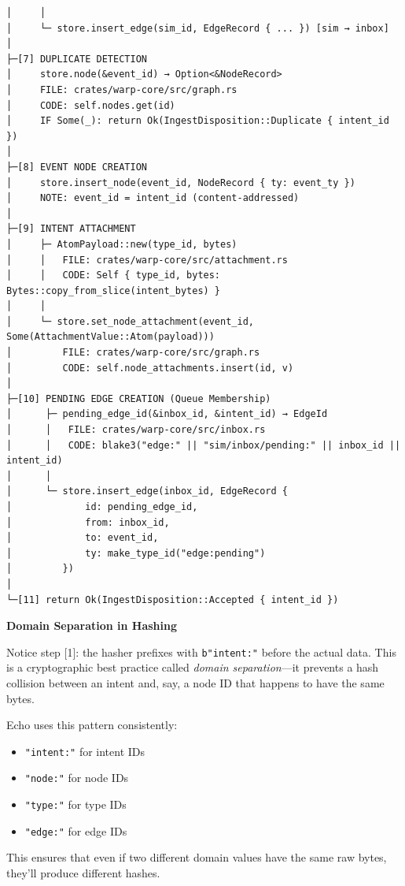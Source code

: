 \documentclass[11pt]{book}
\begin{document}
\begin{verbatim}
│     │
│     └─ store.insert_edge(sim_id, EdgeRecord { ... }) [sim → inbox]
│
├─[7] DUPLICATE DETECTION
│     store.node(&event_id) → Option<&NodeRecord>
│     FILE: crates/warp-core/src/graph.rs
│     CODE: self.nodes.get(id)
│     IF Some(_): return Ok(IngestDisposition::Duplicate { intent_id })
│
├─[8] EVENT NODE CREATION
│     store.insert_node(event_id, NodeRecord { ty: event_ty })
│     NOTE: event_id = intent_id (content-addressed)
│
├─[9] INTENT ATTACHMENT
│     ├─ AtomPayload::new(type_id, bytes)
│     │   FILE: crates/warp-core/src/attachment.rs
│     │   CODE: Self { type_id, bytes: Bytes::copy_from_slice(intent_bytes) }
│     │
│     └─ store.set_node_attachment(event_id, Some(AttachmentValue::Atom(payload)))
│         FILE: crates/warp-core/src/graph.rs
│         CODE: self.node_attachments.insert(id, v)
│
├─[10] PENDING EDGE CREATION (Queue Membership)
│      ├─ pending_edge_id(&inbox_id, &intent_id) → EdgeId
│      │   FILE: crates/warp-core/src/inbox.rs
│      │   CODE: blake3("edge:" || "sim/inbox/pending:" || inbox_id || intent_id)
│      │
│      └─ store.insert_edge(inbox_id, EdgeRecord {
│             id: pending_edge_id,
│             from: inbox_id,
│             to: event_id,
│             ty: make_type_id("edge:pending")
│         })
│
└─[11] return Ok(IngestDisposition::Accepted { intent_id })
\end{verbatim}

\begin{cleverpattern}
\textbf{Domain Separation in Hashing}

Notice step [1]: the hasher prefixes with \texttt{b"intent:"} before the actual data. This is a cryptographic best practice called \emph{domain separation}---it prevents a hash collision between an intent and, say, a node ID that happens to have the same bytes.

Echo uses this pattern consistently:
\begin{itemize}
\item \texttt{"intent:"} for intent IDs
\item \texttt{"node:"} for node IDs
\item \texttt{"type:"} for type IDs
\item \texttt{"edge:"} for edge IDs
\end{itemize}

This ensures that even if two different domain values have the same raw bytes, they'll produce different hashes.
\end{cleverpattern}
\end{document}
